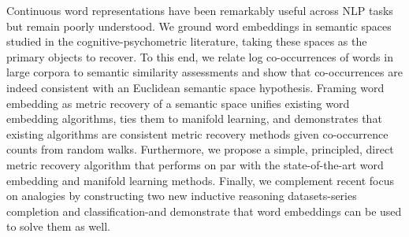 Continuous word representations have been remarkably useful across NLP tasks but remain poorly understood. We ground word embeddings in semantic spaces studied in the cognitive-psychometric literature, taking these spaces as the primary objects to recover. To this end, we relate log co-occurrences of words in large corpora to semantic similarity assessments and show that co-occurrences are indeed consistent with an Euclidean semantic space hypothesis. Framing word embedding as metric recovery of a semantic space unifies existing word embedding algorithms, ties them to manifold learning, and demonstrates that existing algorithms are consistent metric recovery methods given co-occurrence counts from random walks. Furthermore, we propose a simple, principled, direct metric recovery algorithm that performs on par with the state-of-the-art word embedding and manifold learning methods. Finally, we complement recent focus on analogies by constructing two new inductive reasoning datasets-series completion and classification-and demonstrate that word embeddings can be used to solve them as well.
